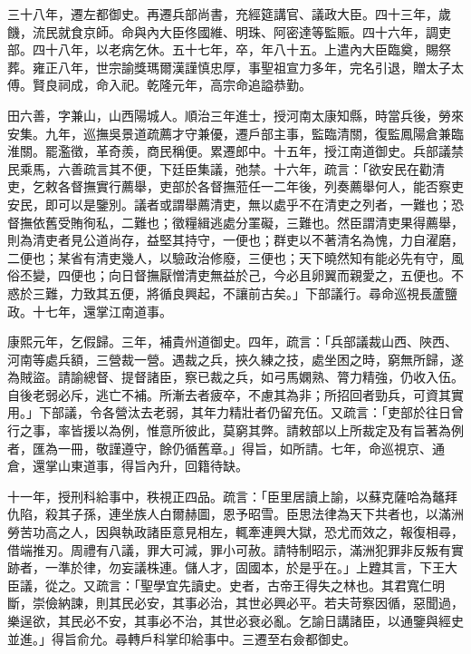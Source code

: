 \begin{pinyinscope}
三十八年，遷左都御史。再遷兵部尚書，充經筵講官、議政大臣。四十三年，歲饑，流民就食京師。命與內大臣佟國維、明珠、阿密達等監賑。四十六年，調吏部。四十八年，以老病乞休。五十七年，卒，年八十五。上遣內大臣臨奠，賜祭葬。雍正八年，世宗諭獎瑪爾漢謹慎忠厚，事聖祖宣力多年，完名引退，贈太子太傅。賢良祠成，命入祀。乾隆元年，高宗命追謚恭勤。

田六善，字兼山，山西陽城人。順治三年進士，授河南太康知縣，時當兵後，勞來安集。九年，巡撫吳景道疏薦才守兼優，遷戶部主事，監臨清關，復監鳳陽倉兼臨淮關。罷濫徵，革奇羨，商民稱便。累遷郎中。十五年，授江南道御史。兵部議禁民乘馬，六善疏言其不便，下廷臣集議，弛禁。十六年，疏言：「欲安民在勸清吏，乞敕各督撫實行薦舉，吏部於各督撫蒞任一二年後，列奏薦舉何人，能否察吏安民，即可以是鑒別。議者或謂舉薦清吏，無以處乎不在清吏之列者，一難也；恐督撫依舊受賄徇私，二難也；徵糧緝逃處分罣礙，三難也。然臣謂清吏果得薦舉，則為清吏者見公道尚存，益堅其持守，一便也；群吏以不著清名為愧，力自濯磨，二便也；某省有清吏幾人，以驗政治修廢，三便也；天下曉然知有能必先有守，風俗丕變，四便也；向日督撫厭憎清吏無益於己，今必且卵翼而親愛之，五便也。不惑於三難，力致其五便，將循良興起，不讓前古矣。」下部議行。尋命巡視長蘆鹽政。十七年，還掌江南道事。

康熙元年，乞假歸。三年，補貴州道御史。四年，疏言：「兵部議裁山西、陜西、河南等處兵額，三營裁一營。遇裁之兵，挾久練之技，處坐困之時，窮無所歸，遂為賊盜。請諭總督、提督諸臣，察已裁之兵，如弓馬嫻熟、膂力精強，仍收入伍。自後老弱必斥，逃亡不補。所漸去者疲卒，不慮其為非；所招回者勁兵，可資其實用。」下部議，令各營汰去老弱，其年力精壯者仍留充伍。又疏言：「吏部於往日曾行之事，率皆援以為例，惟意所彼此，莫窮其弊。請敕部以上所裁定及有旨著為例者，匯為一冊，敬謹遵守，餘仍循舊章。」得旨，如所請。七年，命巡視京、通倉，還掌山東道事，得旨內升，回籍待缺。

十一年，授刑科給事中，秩視正四品。疏言：「臣里居讀上諭，以蘇克薩哈為鼇拜仇陷，殺其子孫，連坐族人白爾赫圖，恩予昭雪。臣思法律為天下共者也，以滿洲勞苦功高之人，因與執政諸臣意見相左，輒牽連興大獄，恐尤而效之，報復相尋，借端推刃。周禮有八議，罪大可減，罪小可赦。請特制昭示，滿洲犯罪非反叛有實跡者，一準於律，勿妄議株連。儲人才，固國本，於是乎在。」上韙其言，下王大臣議，從之。又疏言：「聖學宜先讀史。史者，古帝王得失之林也。其君寬仁明斷，崇儉納諫，則其民必安，其事必治，其世必興必平。若夫苛察因循，惡聞過，樂逞欲，其民必不安，其事必不治，其世必衰必亂。乞諭日講諸臣，以通鑒與經史並進。」得旨俞允。尋轉戶科掌印給事中。三遷至右僉都御史。


\end{pinyinscope}
